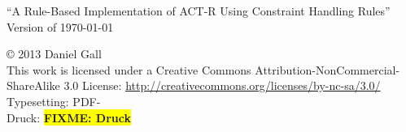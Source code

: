 \documentclass[
    a4paper,
    10pt,
    bibliography=totoc,
    twoside,
    openright,
    numbers=noenddot,
    headings=normal,
    DIV=9,
    parskip
]{scrbook}
\newcommand{\fullname}{Daniel Gall}
\newcommand{\titel}{A Rule-Based Implementation of ACT-R Using Constraint Handling Rules}
\newcommand{\jahr}{2013}
\newcommand{\arbeit}{Masterarbeit}
\newcommand{\FIXME}[1]{\colorbox{yellow}{\bf FIXME: #1}}
\begin{document}
\clearpage
\thispagestyle{empty}
{
    \small \flushleft \enquote{\titel}\\
    Version of \today
    \vfill



    \copyright{} \jahr{} \fullname{}\\[0.5em]
    This work is licensed under a Creative Commons Attribution-NonCommercial-ShareAlike 3.0 License: \url{http://creativecommons.org/licenses/by-nc-sa/3.0/}\\
    Typesetting: PDF-\LaTeXe{}\\
    Druck: \FIXME{Druck}
}




\tableofcontents

\mainmatter



\end{document}
